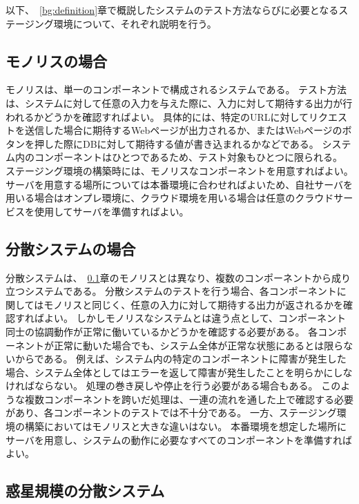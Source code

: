 以下、~\ref{bg:definition}章で概説したシステムのテスト方法ならびに必要となるステージング環境について、それぞれ説明を行う。

\subsection{モノリスの場合}
\label{bg:staging:monolith}

モノリスは、単一のコンポーネントで構成されるシステムである。
テスト方法は、システムに対して任意の入力を与えた際に、入力に対して期待する出力が行われるかどうかを確認すればよい。
具体的には、特定のURLに対してリクエストを送信した場合に期待するWebページが出力されるか、またはWebページのボタンを押した際にDBに対して期待する値が書き込まれるかなどである。
システム内のコンポーネントはひとつであるため、テスト対象もひとつに限られる。
ステージング環境の構築時には、モノリスなコンポーネントを用意すればよい。
サーバを用意する場所については本番環境に合わせればよいため、自社サーバを用いる場合はオンプレ環境に、クラウド環境を用いる場合は任意のクラウドサービスを使用してサーバを準備すればよい。

\subsection{分散システムの場合}
\label{bg:staging:distributed-system}

分散システムは、~\ref{bg:staging:monolith}章のモノリスとは異なり、複数のコンポーネントから成り立つシステムである。
分散システムのテストを行う場合、各コンポーネントに関してはモノリスと同じく、任意の入力に対して期待する出力が返されるかを確認すればよい。
しかしモノリスなシステムとは違う点として、コンポーネント同士の協調動作が正常に働いているかどうかを確認する必要がある。
各コンポーネントが正常に動いた場合でも、システム全体が正常な状態にあるとは限らないからである。
例えば、システム内の特定のコンポーネントに障害が発生した場合、システム全体としてはエラーを返して障害が発生したことを明らかにしなければならない。
処理の巻き戻しや停止を行う必要がある場合もある。
このような複数コンポーネントを跨いだ処理は、一連の流れを通した上で確認する必要があり、各コンポーネントのテストでは不十分である。
一方、ステージング環境の構築においてはモノリスと大きな違いはない。
本番環境を想定した場所にサーバを用意し、システムの動作に必要なすべてのコンポーネントを準備すればよい。

\subsection{惑星規模の分散システム}
\label{bg:staging:planetary-scale-distributed-system}

